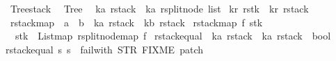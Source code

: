 %
\begin{isabellebody}%
%
%
\isadelimtheory
%
\endisadelimtheory
%
\isatagtheory
{}\isamarkupfalse%
\ Tree{\isacharunderscore}stack\ \isanewline
{}\ Tree\ \isanewline
{}%
\endisatagtheory
{\isafoldtheory}%
%
\isadelimtheory
\isanewline
%
\endisadelimtheory
\isanewline
\isanewline
\isanewline
\isanewline
\isanewline
\isanewline
\isanewline
\isanewline
\isanewline
\isanewline
\isanewline
\isanewline
{}\isamarkupfalse%
\ {\isacharparenleft}{\isacharprime}k{\isacharcomma}{\isacharprime}a{\isacharparenright}\ rstack\ {\isacharequal}\ {\isachardoublequoteopen}{\isacharparenleft}{\isacharprime}k{\isacharcomma}{\isacharprime}a{\isacharparenright}\ rsplit{\isacharunderscore}node\ list{\isachardoublequoteclose}\isanewline
\isanewline
{}\isamarkupfalse%
\ {\isacharparenleft}{\isacharprime}k{\isacharcomma}{\isacharprime}r{\isacharparenright}\ rstk\ {\isacharequal}\ {\isachardoublequoteopen}{\isacharparenleft}{\isacharprime}k{\isacharcomma}{\isacharprime}r{\isacharparenright}\ rstack{\isachardoublequoteclose}\isanewline
\isanewline
\isanewline
\isanewline
{}\isamarkupfalse%
\ rstack{\isacharunderscore}map\ {\isacharcolon}{\isacharcolon}\ {\isachardoublequoteopen}{\isacharparenleft}{\isacharprime}a\ {\isasymRightarrow}\ {\isacharprime}b{\isacharparenright}\ {\isasymRightarrow}\ {\isacharparenleft}{\isacharprime}k{\isacharcomma}{\isacharprime}a{\isacharparenright}\ rstack\ {\isasymRightarrow}\ {\isacharparenleft}{\isacharprime}k{\isacharcomma}{\isacharprime}b{\isacharparenright}\ rstack{\isachardoublequoteclose}\ \isanewline
{\isachardoublequoteopen}rstack{\isacharunderscore}map\ f\ stk\ {\isacharequal}\ {\isacharparenleft}\isanewline
\ \ stk\ {\isacharbar}{\isachargreater}\ List{\isachardot}map\ {\isacharparenleft}rsplit{\isacharunderscore}node{\isacharunderscore}map\ f{\isacharparenright}{\isacharparenright}{\isachardoublequoteclose}\isanewline
\isanewline
{}\isamarkupfalse%
\ rstack{\isacharunderscore}equal\ {\isacharcolon}{\isacharcolon}\ {\isachardoublequoteopen}{\isacharparenleft}{\isacharprime}k{\isacharcomma}{\isacharprime}a{\isacharparenright}\ rstack\ {\isasymRightarrow}\ {\isacharparenleft}{\isacharprime}k{\isacharcomma}{\isacharprime}a{\isacharparenright}\ rstack\ {\isasymRightarrow}\ bool{\isachardoublequoteclose}\ \isanewline
{\isachardoublequoteopen}rstack{\isacharunderscore}equal\ s{}\ s{}\ {\isacharequal}\ failwith\ {\isacharparenleft}STR\ {\isacharprime}{\isacharprime}FIXME\ patch{\isacharprime}{\isacharprime}{\isacharparenright}{\isachardoublequoteclose}\isanewline

\end{isabellebody}
